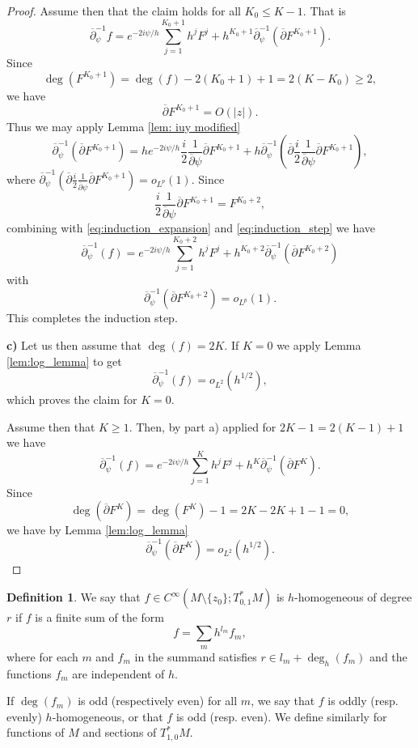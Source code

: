 \documentclass[12pt]{amsart}
\def\p{\partial}
\theoremstyle{definition}
\newtheorem{definition}[theorem]{Definition}
\theoremstyle{remark}
\newcommand{\abs}[1]{\lvert #1 \rvert}
\newcommand{\op}{\overline \p}
\begin{document}
\begin{proof}
Assume then that the claim holds for all $K_0\leq K-1$. That is
\begin{equation}\label{eq:induction_expansion}
 \op_{\psi}^{-1}f=e^{-2i\psi/h}\sum_{j=1}^{K_0+1}h^j F^j+ h^{K_0+1}\op^{-1}_{\psi}(\op F^{K_0+1}).
\end{equation}
Since 
\[
\deg(F^{K_0+1})=\deg(f)-2(K_0+1)+1%
=2(K-K_0)\geq 2, 
\]
we have
 \[
  \op F^{K_0+1}=O(\abs{z}).
 \]
  Thus we may apply Lemma \ref{lem: iuy modified}
\begin{equation}\label{eq:induction_step}
  \op^{-1}_{\psi}(\op F^{K_0+1})=he^{-2i\psi/h} \frac{i}{2}\frac{1}{\op \psi} \op F^{K_0+1}+h\op^{-1}_{\psi}\left(\op \frac{i}{2}\frac{1}{\op \psi} \op F^{K_0+1}\right),
 \end{equation}
 where $\op^{-1}_{\psi}\left(\op \frac{i}{2}\frac{1}{\op \psi} \op F^{K_0+1}\right)=o_{L^p}(1)$. 
Since 
\[
 \frac{i}{2}\frac{1}{\op \psi} \op F^{K_0+1}=F^{K_0+2},
\]
combining with \eqref{eq:induction_expansion} and \eqref{eq:induction_step} we have
\[
 \op_{\psi}^{-1}(f)=e^{-2i\psi/h}\sum_{j=1}^{K_0+2}h^j F^j+ h^{K_0+2}\op^{-1}_{\psi}(\op F^{K_0+2})
 \]
 with
\[
 \op^{-1}_{\psi}(\op F^{K_0+2})=o_{L^p}(1).
\]
This completes the induction step.

\noindent\textbf{c)} Let us then assume that $\deg(f)=2K$. If $K=0$ we apply Lemma  \ref{lem:log_lemma} to get
\[
 \op_\psi^{-1}(f)=o_{L^2}(h^{1/2}),
\]
which proves the claim for $K=0$. 

Assume then that $K\geq 1$. Then, by part a) applied for $2K-1 = 2(K-1) + 1$ we have
\[
 \op_{\psi}^{-1}(f)=e^{-2i\psi/h}\sum_{j=1}^{K}h^j F^j+ h^{K}\op^{-1}_{\psi}(\op F^{K}).
\]
Since 
\[
 \deg(\op F^{K})=\deg(F^{K})-1=2K-2K+1-1=0,
\]
we have by Lemma \ref{lem:log_lemma}
\[
 \op^{-1}_{\psi}(\op F^{K})=o_{L^2}(h^{1/2}).
\]

\end{proof}
 
 \begin{definition}
 We say that $f\in  C^\infty(M\setminus \{z_0\}; T^*_{0,1}M)$ is $h$-homogeneous of degree $r$ if $f$ is a finite sum of the form
 \[
  f=\sum_m h^{l_m} f_m,
 \]
 where for each $m$ and $f_m$ in the summand satisfies $r \in l_m + \deg_h(f_m)$ 
and the functions $f_m$ are independent of $h$. 
 
 If $\deg (f_m)$ is odd (respectively even) for all $m$, we say that $f$ is oddly (resp. evenly) $h$-homogeneous, or that $f$ is odd (resp. even).  We define similarly for functions of $M$ and sections of $T_{1,0}^*M$. 
 \end{definition}
\end{document}
